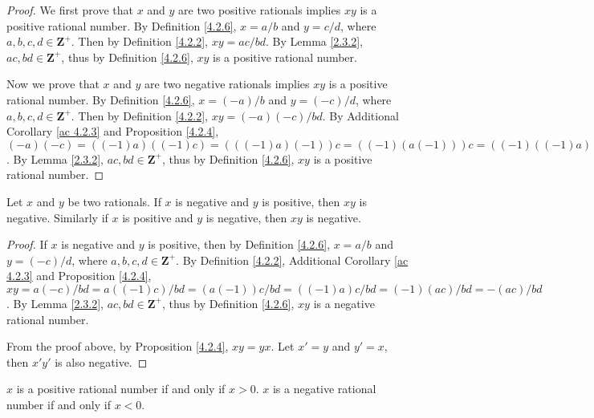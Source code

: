 \begin{proof}
We first prove that \(x\) and \(y\) are two positive rationals implies \(xy\) is a positive rational number.
By Definition \ref{4.2.6}, \(x = a / b\) and \(y = c / d\), where \(a, b, c, d \in \mathbf{Z}^+\).
Then by Definition \ref{4.2.2}, \(xy = ac / bd\).
By Lemma \ref{2.3.2}, \(ac, bd \in \mathbf{Z}^+\), thus by Definition \ref{4.2.6}, \(xy\) is a positive rational number.

Now we prove that \(x\) and \(y\) are two negative rationals implies \(xy\) is a positive rational number.
By Definition \ref{4.2.6}, \(x = (-a) / b\) and \(y = (-c) / d\), where \(a, b, c, d \in \mathbf{Z}^+\).
Then by Definition \ref{4.2.2}, \(xy = (-a)(-c) / bd\).
By Additional Corollary \ref{ac 4.2.3} and Proposition \ref{4.2.4}, \((-a)(-c) = ((-1)a)((-1)c) = (((-1)a)(-1))c = ((-1)(a(-1)))c = ((-1)((-1)a))c = (((-1)(-1))a)c = (1a)c = ac\).
By Lemma \ref{2.3.2}, \(ac, bd \in \mathbf{Z}^+\), thus by Definition \ref{4.2.6}, \(xy\) is a positive rational number.
\end{proof}

\begin{additional corollary}\label{ac 4.2.6}
Let \(x\) and \(y\) be two rationals.
If \(x\) is negative and \(y\) is positive, then \(xy\) is negative.
Similarly if \(x\) is positive and \(y\) is negative, then \(xy\) is negative.
\end{additional corollary}

\begin{proof}
If \(x\) is negative and \(y\) is positive, then by Definition \ref{4.2.6}, \(x = a / b\) and \(y = (-c) / d\), where \(a, b, c, d \in \mathbf{Z}^+\).
By Definition \ref{4.2.2}, Additional Corollary \ref{ac 4.2.3} and Proposition \ref{4.2.4}, \(xy = a(-c) / bd = a((-1)c) / bd = (a(-1))c / bd = ((-1)a)c / bd = (-1)(ac) / bd = -(ac) / bd\).
By Lemma \ref{2.3.2}, \(ac, bd \in \mathbf{Z}^+\), thus by Definition \ref{4.2.6}, \(xy\) is a negative rational number.

From the proof above, by Proposition \ref{4.2.4}, \(xy = yx\).
Let \(x' = y\) and \(y' = x\), then \(x'y'\) is also negative.
\end{proof}

\begin{additional corollary}\label{ac 4.2.7}
\(x\) is a positive rational number if and only if \(x > 0\).
\(x\) is a negative rational number if and only if \(x < 0\).
\end{additional corollary}

